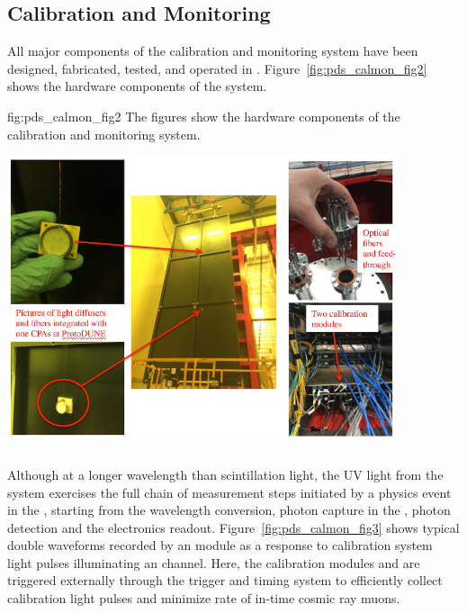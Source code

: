 \subsection{Calibration and Monitoring}
\label{sec:fdsp-pd-validation-candm}


All major components of the   calibration and monitoring system have been designed, fabricated, tested, and operated in .
Figure~\ref{fig:pds_calmon_fig2} shows the hardware components of the system.

 \begin{dunefigure}
 {fig:pds_calmon_fig2}
 {The figures show the hardware components of the  calibration and monitoring system.}
 \includegraphics[angle=0,width=11.4cm,height=9cm]{graphics/pds-calmon-fig2.png}
\end{dunefigure}

Although at a longer wavelength than \lar scintillation light, the UV light from the system exercises the full chain of measurement steps initiated by a physics event in the , starting from the wavelength %
conversion, photon capture in the , photon %
detection and the  electronics readout.
Figure~\ref{fig:pds_calmon_fig3} shows typical double waveforms recorded by an   module as a response to calibration system
light pulses illuminating %
an  channel. Here, the calibration modules and  are triggered externally through the trigger and timing system to efficiently collect calibration light pulses  and minimize rate of in-time cosmic ray muons.

